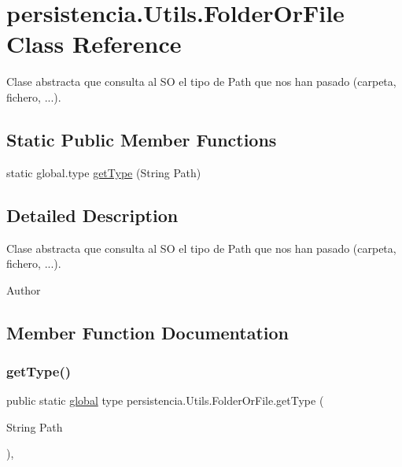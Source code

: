 \hypertarget{classpersistencia_1_1Utils_1_1FolderOrFile}{}\section{persistencia.\+Utils.\+Folder\+Or\+File Class Reference}
\label{classpersistencia_1_1Utils_1_1FolderOrFile}


Clase abstracta que consulta al SO el tipo de Path que nos han pasado (carpeta, fichero, ...).  


\subsection*{Static Public Member Functions}
\begin{DoxyCompactItemize}
\item 
static global.\+type \hyperlink{classpersistencia_1_1Utils_1_1FolderOrFile_a57af4d14d71521f8a9b2b1aaad891fb0}{get\+Type} (String Path)
\end{DoxyCompactItemize}


\subsection{Detailed Description}
Clase abstracta que consulta al SO el tipo de Path que nos han pasado (carpeta, fichero, ...). 

\begin{DoxyAuthor}{Author}

\end{DoxyAuthor}


\subsection{Member Function Documentation}
\mbox{\label{classpersistencia_1_1Utils_1_1FolderOrFile_a57af4d14d71521f8a9b2b1aaad891fb0}} 
\subsubsection{\texorpdfstring{get\+Type()}{getType()}}
{\footnotesize\ttfamily public static \hyperlink{classglobal_1_1global}{global} type persistencia.\+Utils.\+Folder\+Or\+File.\+get\+Type (\begin{DoxyParamCaption}\item[{String}]{Path }\end{DoxyParamCaption})\hspace{0.3cm}{\ttfamily [inline]}, {\ttfamily [static]}}


